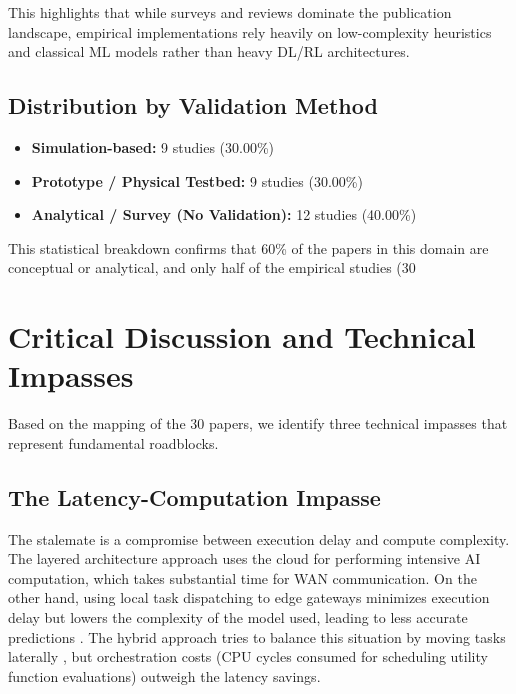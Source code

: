 \documentclass[conference]{IEEEtran}
\begin{document}
This highlights that while surveys and reviews dominate the publication landscape, empirical implementations rely heavily on low-complexity heuristics and classical ML models rather than heavy DL/RL architectures.

\subsection{Distribution by Validation Method}
\begin{itemize}
    \item \textbf{Simulation-based:} 9 studies (30.00\%) \cite{b3, b4, b7, b8, b11, b12, b23, b25, b30}
    \item \textbf{Prototype / Physical Testbed:} 9 studies (30.00\%) \cite{b13, b17, b18, b20, b21, b27, b29}
    \item \textbf{Analytical / Survey (No Validation):} 12 studies (40.00\%) \cite{b1, b2, b5, b6, b9, b10, b14, b15, b16, b19, b22, b24, b26, b28}
\end{itemize}

This statistical breakdown confirms that 60\% of the papers in this domain are conceptual or analytical, and only half of the empirical studies (30%

\section{Critical Discussion and Technical Impasses}
\label{sec:impasses}

Based on the mapping of the 30 papers, we identify three technical impasses that represent fundamental roadblocks.

\subsection{The Latency-Computation Impasse}
The stalemate is a compromise between execution delay and compute complexity. The layered architecture approach uses the cloud for performing intensive AI computation, which takes substantial time for WAN communication. On the other hand, using local task dispatching to edge gateways minimizes execution delay but lowers the complexity of the model used, leading to less accurate predictions \cite{b3,b4,b23}. The hybrid approach tries to balance this situation by moving tasks laterally \cite{b27}, but orchestration costs (CPU cycles consumed for scheduling utility function evaluations) outweigh the latency savings.
\end{document}

